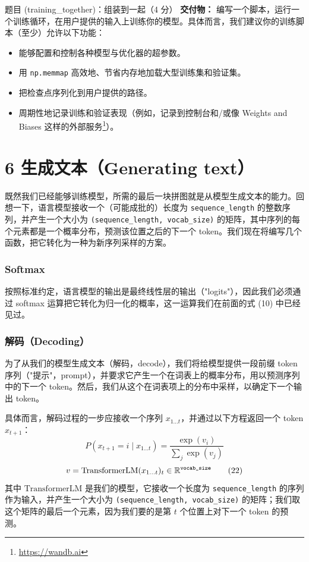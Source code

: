 \begin{problembox}{题目 (training\_together)：组装到一起（4 分）}
\textbf{交付物：} 编写一个脚本，运行一个训练循环，在用户提供的输入上训练你的模型。具体而言，我们建议你的训练脚本（至少）允许以下功能：
\begin{itemize}
\item 能够配置和控制各种模型与优化器的超参数。
\item 用 \texttt{np.memmap} 高效地、节省内存地加载大型训练集和验证集。
\item 把检查点序列化到用户提供的路径。
\item 周期性地记录训练和验证表现（例如，记录到控制台和/或像 Weights and Biases 这样的外部服务\footnote{\url{https://wandb.ai}}）。
\end{itemize}
\end{problembox}

\section*{6 生成文本（Generating text）}

既然我们已经能够训练模型，所需的最后一块拼图就是从模型生成文本的能力。回想一下，语言模型接收一个（可能成批的）长度为 \texttt{sequence\_length} 的整数序列，并产生一个大小为 \texttt{(sequence\_length, vocab\_size)} 的矩阵，其中序列的每个元素都是一个概率分布，预测该位置之后的下一个 token。我们现在将编写几个函数，把它转化为一种为新序列采样的方案。

\subsubsection*{Softmax}

按照标准约定，语言模型的输出是最终线性层的输出（"logits"），因此我们必须通过 softmax 运算把它转化为归一化的概率，这一运算我们在前面的式 (10) 中已经见过。

\subsubsection*{解码（Decoding）}

为了从我们的模型生成文本（解码，decode），我们将给模型提供一段前缀 token 序列（"提示"，prompt），并要求它产生一个在词表上的概率分布，用以预测序列中的下一个 token。然后，我们从这个在词表项上的分布中采样，以确定下一个输出 token。

具体而言，解码过程的一步应接收一个序列 $x_{1\dots t}$，并通过以下方程返回一个 token $x_{t+1}$：
\begin{equation*}
P(x_{t+1} = i \mid x_{1\dots t}) = \frac{\exp(v_i)}{\sum_j \exp(v_j)} \tag{21}
\end{equation*}
\begin{equation*}
v = \mathrm{TransformerLM}(x_{1\dots t})_t \in \mathbb{R}^{\texttt{vocab\_size}} \tag{22}
\end{equation*}
其中 $\mathrm{TransformerLM}$ 是我们的模型，它接收一个长度为 \texttt{sequence\_length} 的序列作为输入，并产生一个大小为 \texttt{(sequence\_length, vocab\_size)} 的矩阵；我们取这个矩阵的最后一个元素，因为我们要的是第 $t$ 个位置上对下一个 token 的预测。

